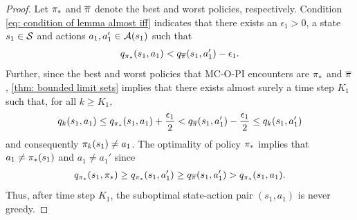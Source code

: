 \begin{proof}


Let ${\pi}_*$ and $\overline{\pi}$ denote the best and worst policies, respectively.
Condition \eqref{eq: condition of lemma almost iff} indicates that there exists an $\epsilon_1 > 0$, a state $s_1 \in \mathcal{S}$ and actions $a_1, a_1' \in \mathcal{A}(s_1)$ such that
\begin{align*}
    q_{{\pi}_*}(s_1, a_1)
    < q_{\overline{\pi}}(s_1, a_1' ) - \epsilon_1 .
\end{align*}
Further, since the best and worst policies that MC-O-PI encounters are ${\pi}_*$ and $\overline{\pi}$,
\autoref{thm: bounded limit sets} 
implies that there exists almost surely a time step $K_1$ such that, for all $k \geq K_1$,
\begin{align*}
    q_k(s_1, a_1)
    \leq
    q_{{\pi}_*}(s_1, a_1) + \frac{\epsilon_1}{2}
    <
    q_{\overline{\pi}}(s_1, a_1') - \frac{\epsilon_1}{2}
    \leq
    q_k(s_1, a_1') 
\end{align*}
and consequently $\pi_k(s_1) \neq a_1$.
The optimality of policy ${\pi}_*$ implies that 
$a_1 \neq {\pi}_*(s_1)$ and $a_1 \neq a_1'$
since
\begin{align*}
    q_{{\pi}_*}(s_1, {\pi}_*) 
    \geq q_{{\pi}_*}(s_1, a_1')
    \geq q_{\overline{\pi}}(s_1, a_1')
    > q_{{\pi}_*}(s_1, a_1) .
\end{align*}
Thus, after time step $K_1$, the suboptimal state-action pair $(s_1, a_1)$ is never greedy.


\end{proof}
